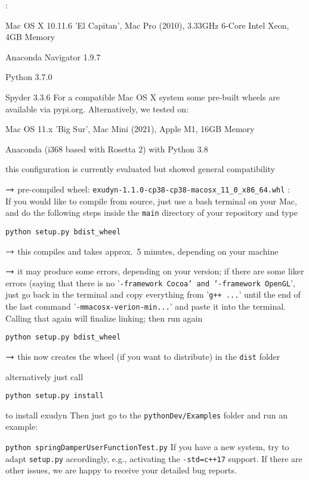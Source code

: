 \noindent {}:
\bi
  \item Mac OS X 10.11.6 'El Capitan', Mac Pro (2010), 3.33GHz 6-Core Intel Xeon, 4GB Memory
  \item Anaconda Navigator 1.9.7
  \item Python 3.7.0
  \item Spyder 3.3.6
\ei
For a compatible Mac OS X system some pre-built wheels are available via pypi.org. 
%
Alternatively, we tested on:
\bi
  \item Mac OS 11.x 'Big Sur', Mac Mini (2021), Apple M1, 16GB Memory
  \item Anaconda (i368 based with Rosetta 2) with Python 3.8
  \item this configuration is currently evaluated but showed general compatibility
  \item[] $\rightarrow$ pre-compiled wheel: \texttt{exudyn-1.1.0-cp38-cp38-macosx\_11\_0\_x86\_64.whl}
\ei
\vspace{9pt}
:\vspace{3pt}\\
If you would like to compile from source, just use a bash terminal on your Mac, and do the following steps inside the \texttt{main} directory of your repository and type
\bi
  \item \texttt{python setup.py bdist\_wheel}
  \item[] $\rightarrow$ this compiles and takes approx.~5 minutes, depending on your machine
  \item[] $\rightarrow$ it may produce some errors, depending on your version; if there are some liker errors (saying that there is no '\texttt{-framework Cocoa' and '-framework OpenGL}', just go back in the terminal and copy everything from '\texttt{g++ ...}' until the end of the last command '\texttt{-mmacosx-verion-min...}' and paste it into the terminal. Calling that again will finalize linking; then run again
  \item[] \texttt{python setup.py bdist\_wheel}
  \item[] $\rightarrow$ this now creates the wheel (if you want to distribute) in the \texttt{dist} folder
  \item[] alternatively just call
  \item \texttt{python setup.py install}
  \item[] to install exudyn
\ei
Then just go to the \texttt{pythonDev/Examples} folder and run an example:
\bi
  \item[] \texttt{python springDamperUserFunctionTest.py}
\ei
If you have a new system, try to adapt \texttt{setup.py} accordingly, e.g., activating the \texttt{-std=c++17} support.
If there are other issues, we are happy to receive your detailed bug reports. 

